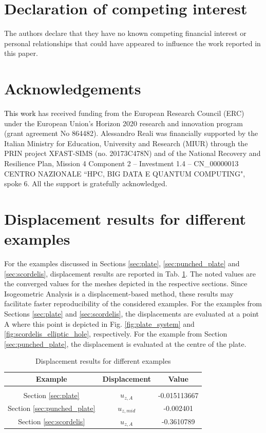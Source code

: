 \documentclass[3p]{elsarticle}
\newcommand{\reviewed}{\textcolor{black}}	%
\begin{document}
\section*{Declaration of competing interest}
The authors declare that they have no known competing financial interest or personal relationships that could have appeared to influence the work reported in this paper.

\section*{Acknowledgements}
\reviewed{This work} has received funding from the European Research Council (ERC) under the European Union's Horizon 2020 research and innovation program (grant agreement No 864482). Alessandro Reali was financially supported by the Italian Ministry for Education, University and Research (MIUR) through the PRIN project XFAST-SIMS (no. 20173C478N) and of the National Recovery and Resilience Plan, Mission 4 Component 2 -- Investment 1.4 -- CN\_00000013 CENTRO NAZIONALE ``HPC, BIG DATA E QUANTUM COMPUTING", spoke 6. All the support is gratefully acknowledged.

\appendix
\section{Displacement results for different examples}\label{app:displacement_results}
For the examples discussed in Sections \ref{sec:plate}, \ref{sec:punched_plate} and \ref{sec:scordelis}, displacement results are reported in Tab. \ref{tab:displacement_results}. The noted values are the converged values for the meshes depicted in the respective sections. Since Isogeometric Analysis is a displacement-based method, these results may facilitate faster reproducibility of the considered examples. For the examples from Sections \ref{sec:plate} and \ref{sec:scordelis}, the displacements are evaluated at a point A where this point is depicted in Fig. \ref{fig:plate_system} and \ref{fig:scordelis_elliptic_hole}, respectively. For the example from Section \ref{sec:punched_plate}, the displacement is evaluated at the centre of the plate.
\begin{table} 
	\caption{\label{tab:displacement_results}Displacement results for different examples}
	\begin{center}
		\begin{tabular}{ccc}
			{Example} & {Displacement} & {Value} \\ \hline &&\\[-2ex]
			Section \ref{sec:plate} & $u_{z,A}$ & -0.015113667 \\
			Section \ref{sec:punched_plate} & $u_{z,mid}$ & -0.002401 \\
			Section \ref{sec:scordelis} & $u_{z,A}$ & -0.3610789
		\end{tabular}
	\end{center}
\end{table}
\end{document}
